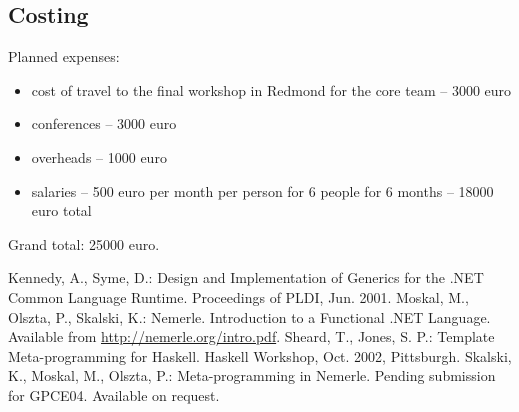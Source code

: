 \documentclass[a4paper,11pt]{article}
\begin{document}
\subsection{Costing}

Planned expenses:

\begin{itemize}
  \item cost of travel to the final workshop 
    in Redmond for the core team -- 3000 euro
  \item conferences -- 3000 euro
  \item overheads -- 1000 euro
  \item salaries -- 500 euro per month per person
    for 6 people for 6 months -- 18000 euro total
\end{itemize}

Grand total: 25000 euro.



\begin{thebibliography}{22}
Kennedy, A., Syme, D.:
Design and Implementation of Generics for the .NET Common Language Runtime.
Proceedings of PLDI, Jun. 2001.
Moskal, M., Olszta, P., Skalski, K.:
Nemerle. Introduction to a Functional .NET Language.
Available from \url{http://nemerle.org/intro.pdf}.
Sheard, T., Jones, S. P.:
Template Meta-programming for Haskell.
Haskell Workshop, Oct. 2002, Pittsburgh.
Skalski, K., Moskal, M., Olszta, P.:
Meta-programming in Nemerle.
Pending submission for GPCE04. Available on request.
\end{thebibliography}
\end{document}
